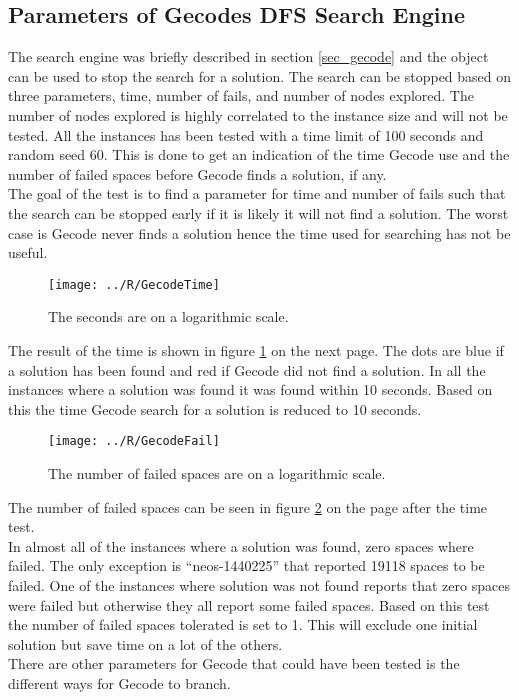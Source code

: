 \subsection{Parameters of Gecodes DFS Search Engine} \label{sub_gectest}
The search engine was briefly described in section \ref{sec_gecode} and the  object can be used to 
stop the search for a solution. The search can be stopped based on three parameters, time, number of fails, and number 
of nodes explored. The number of nodes explored is highly correlated to the instance size and will not be tested. All 
the instances has been tested with a time limit of 100 seconds and random seed 60. This is done to get an indication 
of the time Gecode use and the number of failed spaces before Gecode finds a solution, if any. \\ 
The goal of the test is to find a parameter for time and number of fails such that the search can be stopped early if 
it is likely it will not find a solution. The worst case is Gecode never finds a solution hence the time used for 
searching has not be useful. \\
\begin{figure}[!h]
\centering
\texttt{[image: ../R/GecodeTime]} \caption{The seconds are on a logarithmic 
scale.}\label{fig_gecodetime}
\end{figure}\noindent
The result of the time is shown in figure \ref{fig_gecodetime} on the next page. The dots are blue if a solution has 
been found and red if Gecode did not find a solution. In all the instances where a solution was found it was found 
within 10 seconds. Based on this the time Gecode search for a solution is reduced to 10 seconds. \\ 
\begin{figure}[!h]
\centering
\texttt{[image: ../R/GecodeFail]} \caption{The number of failed spaces are on a logarithmic 
scale.}\label{fig_gecodefail}
\end{figure}\noindent
The number of failed spaces can be seen in figure \ref{fig_gecodefail} on the page after the time test. \\ 
In almost all of the instances where a solution was found, zero spaces where failed. The only exception is 
``neos-1440225'' that reported 19118 spaces to be failed. One of the instances where solution was not found reports 
that zero spaces were failed but otherwise they all report some failed spaces. Based on this test the number of failed 
spaces tolerated is set to 1. This will exclude one initial solution but save time on a lot of the others. \\ 
There are other parameters for Gecode that could have been tested is the different ways for Gecode to branch. \\ 
\phantom{p. 1}
\clearpage
